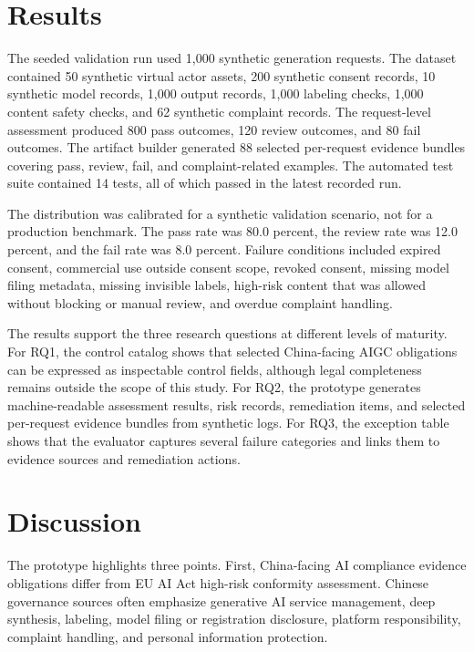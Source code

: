 \documentclass[10pt,journal]{IEEEtran}
\begin{document}
\section{Results}

The seeded validation run used 1,000 synthetic generation requests. The dataset contained 50 synthetic virtual actor assets, 200 synthetic consent records, 10 synthetic model records, 1,000 output records, 1,000 labeling checks, 1,000 content safety checks, and 62 synthetic complaint records. The request-level assessment produced 800 pass outcomes, 120 review outcomes, and 80 fail outcomes. The artifact builder generated 88 selected per-request evidence bundles covering pass, review, fail, and complaint-related examples. The automated test suite contained 14 tests, all of which passed in the latest recorded run.

The distribution was calibrated for a synthetic validation scenario, not for a production benchmark. The pass rate was 80.0 percent, the review rate was 12.0 percent, and the fail rate was 8.0 percent. Failure conditions included expired consent, commercial use outside consent scope, revoked consent, missing model filing metadata, missing invisible labels, high-risk content that was allowed without blocking or manual review, and overdue complaint handling.

The results support the three research questions at different levels of maturity. For RQ1, the control catalog shows that selected China-facing AIGC obligations can be expressed as inspectable control fields, although legal completeness remains outside the scope of this study. For RQ2, the prototype generates machine-readable assessment results, risk records, remediation items, and selected per-request evidence bundles from synthetic logs. For RQ3, the exception table shows that the evaluator captures several failure categories and links them to evidence sources and remediation actions.


\FloatBarrier
\section{Discussion}

The prototype highlights three points. First, China-facing AI compliance evidence obligations differ from EU AI Act high-risk conformity assessment. Chinese governance sources often emphasize generative AI service management, deep synthesis, labeling, model filing or registration disclosure, platform responsibility, complaint handling, and personal information protection.
\end{document}
